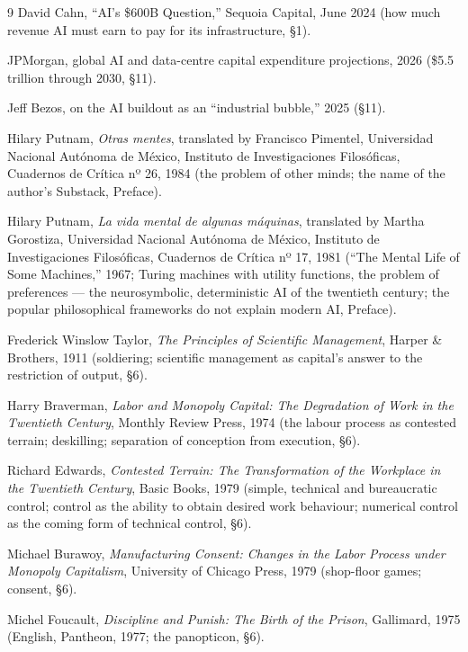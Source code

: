 \documentclass[11pt]{article}
\begin{document}
\begin{thebibliography}{9}
 David Cahn, ``AI's \$600B Question,'' Sequoia
Capital, June 2024 (how much revenue AI must earn to pay for its
infrastructure, §1).

 JPMorgan, global AI and data-centre capital
expenditure projections, 2026 (\$5.5 trillion through 2030, §11).

 Jeff Bezos, on the AI buildout as an ``industrial
bubble,'' 2025 (§11).

 Hilary Putnam, \textit{Otras mentes}, translated by
Francisco Pimentel, Universidad Nacional Autónoma de México, Instituto
de Investigaciones Filosóficas, Cuadernos de Crítica nº 26, 1984 (the
problem of other minds; the name of the author's Substack, Preface).

 Hilary Putnam, \textit{La vida mental de algunas
máquinas}, translated by Martha Gorostiza, Universidad Nacional
Autónoma de México, Instituto de Investigaciones Filosóficas,
Cuadernos de Crítica nº 17, 1981 (``The Mental Life of Some Machines,''
1967; Turing machines with utility functions, the problem of
preferences --- the neurosymbolic, deterministic AI of the twentieth
century; the popular philosophical frameworks do not explain modern AI,
Preface).

 Frederick Winslow Taylor, \textit{The Principles
of Scientific Management}, Harper \& Brothers, 1911 (soldiering;
scientific management as capital's answer to the restriction of output,
\S 6).

 Harry Braverman, \textit{Labor and Monopoly
Capital: The Degradation of Work in the Twentieth Century}, Monthly
Review Press, 1974 (the labour process as contested terrain; deskilling;
separation of conception from execution, \S 6).

 Richard Edwards, \textit{Contested Terrain: The
Transformation of the Workplace in the Twentieth Century}, Basic Books,
1979 (simple, technical and bureaucratic control; control as the ability
to obtain desired work behaviour; numerical control as the coming form
of technical control, \S 6).

 Michael Burawoy, \textit{Manufacturing Consent:
Changes in the Labor Process under Monopoly Capitalism}, University of
Chicago Press, 1979 (shop-floor games; consent, \S 6).

 Michel Foucault, \textit{Discipline and Punish:
The Birth of the Prison}, Gallimard, 1975 (English, Pantheon, 1977; the
panopticon, \S 6).


\end{thebibliography}
\end{document}
